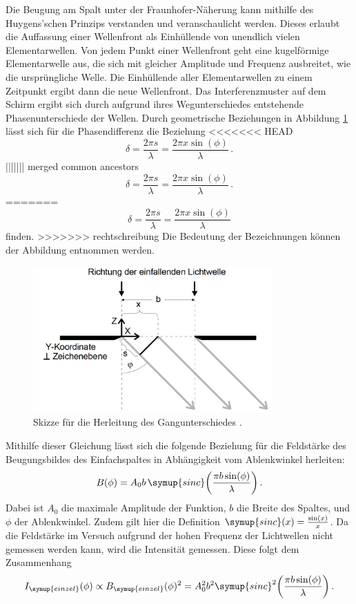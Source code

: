 Die Beugung am Spalt unter der Fraunhofer-Näherung kann mithilfe des Huygens'schen
Prinzips verstanden und veranschaulicht werden. Dieses erlaubt die Auffassung einer
Wellenfront als Einhüllende von unendlich vielen Elementarwellen. Von jedem Punkt
einer Wellenfront geht eine kugelförmige Elementarwelle aus, die sich mit gleicher Amplitude und
Frequenz ausbreitet, wie die ursprüngliche Welle. Die Einhüllende aller Elementarwellen
zu einem Zeitpunkt ergibt dann die neue Wellenfront.
Das Interferenzmuster auf dem Schirm ergibt sich durch aufgrund ihres Wegunterschiedes
entstehende Phasenunterschiede der Wellen. Durch geometrische Beziehungen in
Abbildung \ref{fig:gangunterschied} lässt sich für die Phasendifferenz die
Beziehung
<<<<<<< HEAD
\begin{equation*}
  \delta = \frac{2\pi s}{\lambda} = \frac{2 \pi x \sin(\phi)}{\lambda} \,.
\end{equation*}
||||||| merged common ancestors
\begin{equation}
  \delta = \frac{2\pi s}{\lambda} = \frac{2 \pi x \sin(\phi)}{\lambda} \,.
\end{equation}
=======
\begin{equation}
  \delta = \frac{2\pi s}{\lambda} = \frac{2 \pi x \sin(\phi)}{\lambda}
\end{equation}
finden.
>>>>>>> rechtschreibung
Die Bedeutung der Bezeichnungen können der Abbildung entnommen werden.

\begin{figure}
  \centering
  \includegraphics[width=260pt]{data/gangunterschied.png}
  \caption{Skizze für die Herleitung des Gangunterschiedes \cite{Versuchsanleitung}.}
  \label{fig:gangunterschied}
\end{figure}


Mithilfe dieser Gleichung lässt sich die folgende Beziehung für
die Feldstärke des Beugungsbildes des Einfachspaltes in Abhängigkeit vom Ablenkwinkel herleiten:
\begin{equation*}
  B(\phi)= A_0 b \, \symup{sinc}\biggl(\frac{\pi b \sin(\phi)}{\lambda}\biggr) \,.
\end{equation*}
Dabei ist $A_0$ die maximale Amplitude der Funktion, $b$ die Breite des Spaltes,
und $\phi$ der Ablenkwinkel. Zudem gilt hier die Definition $\symup{sinc}(x)=\frac{\sin(x)}{x}$.
Da die Feldstärke im Versuch aufgrund der hohen Frequenz der Lichtwellen nicht gemessen
werden kann, wird die Intensität gemessen. Diese folgt dem Zusammenhang
\begin{equation}
  I_{\symup{einzel}}(\phi) \propto B_{\symup{einzel}}(\phi)^2=A_0^2 b^2 \symup{sinc}^2\biggl(\frac{\pi b \sin(\phi)}{\lambda}\biggr)  \,.
  \label{eqn:einzeltheo}
\end{equation}

